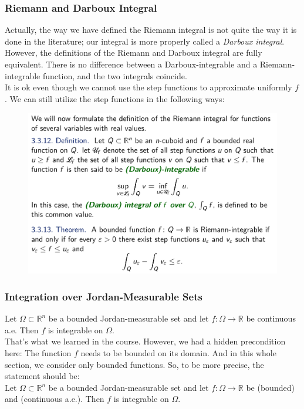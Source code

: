 \documentclass[12pt, t]{beamer}
\renewcommand{\emph}[1]{{\color{Turquoise3}\textsl{#1}}}
\newcommand{\nullspace}{~\\[15pt]}
\begin{document}
\begin{frame}[allowframebreaks]
    \frametitle{Riemann and Darboux Integral}

    Actually, the way we have defined the Riemann integral is not quite
    the way it is done in the literature; our integral is more properly
    called a \emph{Darboux integral}. However, the definitions of the Riemann
    and Darboux integral are fully equivalent. There is no difference
    between a Darboux-integrable and a Riemann-integrable function,
    and the two integrals coincide.
    \nullspace
    It is ok even though we cannot use the step functions to approximate uniformly $f$. We can still utilize the step functions in the following ways:
    \newpage
    \begin{figure}[H]
        \centering
        \includegraphics[width=\textwidth]{Figures/2020-07-01-11-14-48.png}
    \end{figure}
\end{frame}

\begin{frame}
    \frametitle{Integration over Jordan-Measurable Sets}
    Let $\Omega \subset \mathbb{R}^{n}$ be a bounded Jordan-measurable set and let $f: \Omega \rightarrow \mathbb{R}$ be continuous a.e. Then $f$ is integrable on $\Omega$.
    \nullspace
    That's what we learned in the course. However, we had a hidden precondition here: The function $f$ needs to be bounded on its domain. And in this whole section, we consider only bounded functions. So, to be more precise, the statement should be:
    \nullspace
    Let $\Omega \subset \mathbb{R}^{n}$ be a bounded Jordan-measurable set and let $f: \Omega \rightarrow \mathbb{R}$ be (bounded) and (continuous a.e.). Then $f$ is integrable on $\Omega$.
\end{frame}
\end{document}
